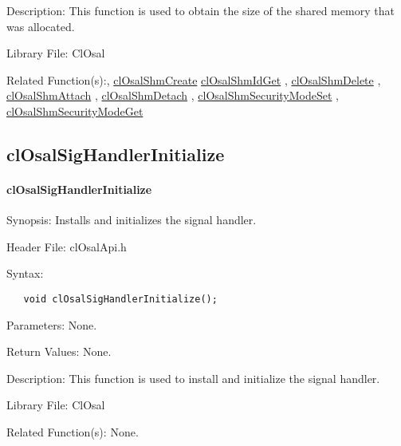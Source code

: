 \begin{Desc}
\item[Description:]This function is used to obtain the size of the shared memory that was allocated.\end{Desc}
\begin{Desc}
\item[Library File:]Cl\-Osal\end{Desc}
\begin{Desc}
\item[Related Function(s):,]\hyperlink{pageosal145}{cl\-Osal\-Shm\-Create} \hyperlink{pageosal146}{cl\-Osal\-Shm\-Id\-Get} , 
\hyperlink{pageosal147}{cl\-Osal\-Shm\-Delete} , \hyperlink{pageosal148}{cl\-Osal\-Shm\-Attach} , 
\hyperlink{pageosal149}{cl\-Osal\-Shm\-Detach} , \hyperlink{pageosal150}{cl\-Osal\-Shm\-Security\-Mode\-Set} , 
\hyperlink{pageosal151}{cl\-Osal\-Shm\-Security\-Mode\-Get} \end{Desc}

\newpage
\subsection{clOsalSigHandlerInitialize}
\hypertarget{pageosal153}{}\paragraph{cl\-Osal\-Sig\-Handler\-Initialize}\label{pageosal153}
\begin{Desc}
\item[Synopsis:]Installs and initializes the signal handler.\end{Desc}
\begin{Desc}
\item[Header File:]clOsalApi.h\end{Desc}
\begin{Desc}
\item[Syntax:]

\footnotesize\begin{verbatim}   void clOsalSigHandlerInitialize();
\end{verbatim}
\normalsize
\end{Desc}
\begin{Desc}
\item[Parameters:]None.\end{Desc}
\begin{Desc}
\item[Return Values:]None.\end{Desc}
\begin{Desc}
\item[Description:]This function is used to install and initialize the signal handler.\end{Desc}
\begin{Desc}
\item[Library File:]Cl\-Osal\end{Desc}
\begin{Desc}
\item[Related Function(s):]None. \end{Desc}

